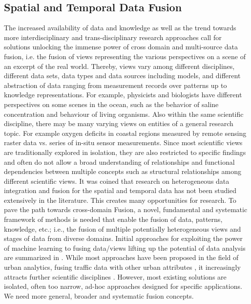 \documentclass[11pt,dvipdfm]{article}
\begin{document}
\subsection{Spatial and Temporal Data Fusion}
The increased availability of data and knowledge as
well as the trend towards more interdisciplinary and
trans-disciplinary research approaches call for solutions unlocking the immense power of cross domain and multi-source data fusion, i.e. the fusion of views representing the various perspectives on a scene of an excerpt of the real world. Thereby, views vary among different disciplines, different data sets, data types and data sources including models, and different abstraction of data ranging from measurement records over patterns up to knowledge representations. For example, physicists and biologists have different
perspectives on some scenes in the ocean, such as
the behavior of saline concentration and behaviour
of living organisms. Also within the same scientific
discipline, there may be many varying views on entities
of a general research topic. For example oxygen
deficits in coastal regions measured by remote sensing
raster data vs. series of in-situ sensor measurements.
Since most scientific views are traditionally
explored in isolation, they are also restricted to specific findings and often do not allow a broad understanding of relationships and functional dependencies between multiple concepts such as structural relationships among different scientific views.
  It was coined that 
  research on heterogeneous data integration and fusion for the spatial and temporal data has not been studied extensively in the literature. This creates many opportunities for research. To pave the path towards cross-domain Fusion,
a novel, fundamental and systematic framework of
methods is needed that enable the fusion of data,
patterns, knowledge, etc.; i.e., the fusion of multiple
potentially heterogeneous views and stages of
data from diverse domains. 
Initial approaches for exploiting the power of machine
learning to fusing data/views lifting up the potential
of data analysis are summarized in \cite{meng2020survey}. While most
approaches have been proposed in the field of urban
analytics, fusing traffic data with other urban attributes \cite{liu2020urban,khan2021deep,zheng2015methodologies}, it increasingly attracts further
scientific disciplines \cite{soldi2021space,karagiannopoulou2022data}. However, most existing
solutions are isolated, often too narrow, ad-hoc approaches
designed for specific applications. We need
more general, broader and systematic fusion concepts.
\end{document}
